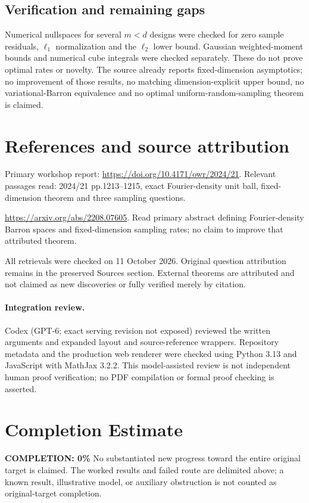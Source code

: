\documentclass[11pt]{article}
\begin{document}
\subsection{Verification and remaining gaps}
Numerical nullspaces for several $m<d$ designs were checked for zero sample residuals, $\ell_1$ normalization and the $\ell_2$ lower bound. Gaussian weighted-moment bounds and numerical cube integrals were checked separately. These do not prove optimal rates or novelty. The source already reports fixed-dimension asymptotics; no improvement of those results, no matching dimension-explicit upper bound, no variational-Barron equivalence and no optimal uniform-random-sampling theorem is claimed.

\section{References and source attribution}
Primary workshop report: \url{https://doi.org/10.4171/owr/2024/21}. Relevant passages read: 2024/21 pp.1213--1215, exact Fourier-density unit ball, fixed-dimension theorem and three sampling questions.

\url{https://arxiv.org/abs/2208.07605}. Read primary abstract defining Fourier-density Barron spaces and fixed-dimension sampling rates; no claim to improve that attributed theorem.

All retrievals were checked on 11 October 2026. Original question attribution remains in the preserved Sources section. External theorems are attributed and not claimed as new discoveries or fully verified merely by citation.


\paragraph{Integration review.} Codex (GPT-6; exact serving revision not exposed) reviewed the written arguments and expanded layout and source-reference wrappers. Repository metadata and the production web renderer were checked using Python 3.13 and JavaScript with MathJax 3.2.2. This model-assisted review is not independent human proof verification; no PDF compilation or formal proof checking is asserted.

\section{Completion Estimate}
\noindent\textbf{COMPLETION: 0\%}
No substantiated new progress toward the entire original target is claimed. The worked results and failed route are delimited above; a known result, illustrative model, or auxiliary obstruction is not counted as original-target completion.
\end{document}
